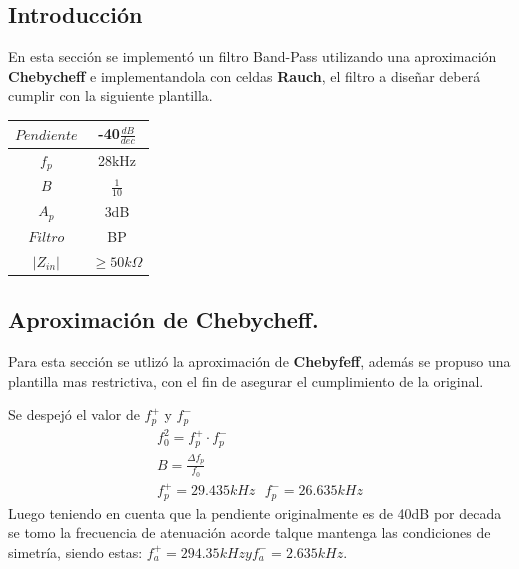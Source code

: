 


\subsection{Introducción}

En esta sección se implementó un filtro Band-Pass utilizando una aproximación \textbf{Chebycheff} e implementandola con celdas \textbf{Rauch}, el filtro a diseñar deberá cumplir con la siguiente plantilla.
\begin{table}[H]
\centering
\begin{tabular}{|c|c|}
\hline
$Pendiente$      & -40$\frac{dB}{dec}$           \\ \hline
$f_p$      & 28kHz          \\ \hline
$B$      & $\frac{1}{10}$           \\ \hline
$A_p$      & 3dB               \\ \hline
$Filtro$      & BP              \\ \hline
$|Z_{in}|$ & $\geq 50k \Omega$ \\ \hline
\end{tabular}
\end{table}
\subsection{Aproximación de Chebycheff.}
Para esta sección se utlizó la aproximación de \textbf{Chebyfeff}, además se propuso una plantilla mas restrictiva, con el fin de asegurar el cumplimiento de la original. 

Se despejó el valor de $f_p^+$ y $f_p^-$ 
\begin{align}
f_0^2 = f_p^+ \cdot f_p^- \\
B = \frac{\Delta f_p}{f_0}\\
f_p^+ =29.435 kHz  \ \ \ f_p^- = 26.635 kHz
\end{align}
Luego teniendo en cuenta que la pendiente originalmente es de 40dB por decada se tomo la frecuencia de atenuación acorde  talque mantenga las condiciones de simetría, siendo estas: $f_a^+= 294.35kHz y f_a^- = 2.635kHz$.


